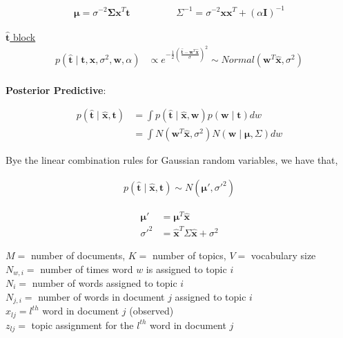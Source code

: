 \documentclass[10pt]{homeworg}
\begin{document}
\vspace{-1cm}

\begin{align*}
\boldsymbol \mu = \sigma^{-2}\boldsymbol \Sigma \boldsymbol x^T \boldsymbol t  \hspace{2cm} \Sigma^{-1} = \sigma^{-2}\boldsymbol x\boldsymbol x^T + (\alpha \boldsymbol I)^{-1}
\end{align*}


\underline{$\hat{\boldsymbol t}$ block}
\begin{align*}
p(\hat{\boldsymbol t} \mid \boldsymbol t, \boldsymbol x, \sigma^2, \boldsymbol w, \alpha) &\propto e^{-\frac{1}{2}(\frac{\hat{\boldsymbol t}-\boldsymbol w^T\hat{\boldsymbol x}}{\sigma})^2} \sim Normal(\boldsymbol w^T\hat{\boldsymbol x}, \sigma^2)
\end{align*}
\\


\textbf{Posterior Predictive}:

\begin{align*}
p(\hat{\boldsymbol t} \mid \hat{\boldsymbol x}, \boldsymbol t) &= \int p(\hat{\boldsymbol t} \mid \hat{\boldsymbol x}, \boldsymbol w)p(\boldsymbol w \mid \boldsymbol t)dw\\
&= \int N(\boldsymbol w^T \hat{\boldsymbol x}, \sigma^2)N(\boldsymbol w \mid \boldsymbol \mu, \Sigma)dw
\end{align*}

Bye the linear combination rules for Gaussian random variables, we have that,

\begin{align*}
p(\hat{\boldsymbol t} \mid \hat{\boldsymbol x}, \boldsymbol t) \sim N(\boldsymbol \mu', \sigma'^2)
\end{align*}

\vspace{-1cm}

\begin{align*}
\boldsymbol \mu' &= \boldsymbol \mu^T\hat{\boldsymbol x}\\
\sigma'^2 &= \hat{\boldsymbol x}^T \Sigma \hat{\boldsymbol x} + \sigma^2
\end{align*}

\exercise
$M = $ number of documents, $K = $ number of topics, $V = $ vocabulary size\\
$N_{w,i} = $ number of times word $w$ is assigned to topic $i$\\
$N_i = $ number of words assigned to topic $i$\\
$N_{j,i} = $ number of words in document $j$ assigned to topic $i$\\
$x_{lj} = l^{th}$ word in document $j$ (observed)\\
$z_{lj} = $ topic assignment for the $l^{th}$ word in document $j$
\end{document}
